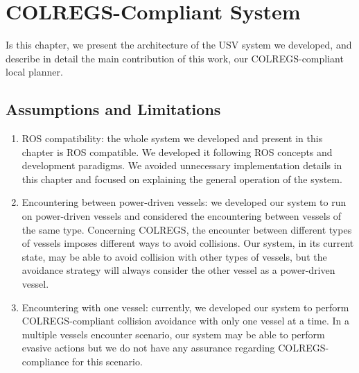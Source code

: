 \chapter{COLREGS-Compliant System}
\label{chap:4_COLREGS_Compliant_Guidance_System}

    Is this chapter, we present the architecture of the \ac{USV} system we developed, and describe in detail the main contribution of this work, our COLREGS-compliant local planner. 

\section{Assumptions and Limitations}
\label{sec:assum_and_limits}


    \begin{enumerate}
        
        \item \ac{ROS} compatibility: the whole system we developed and present in this chapter is ROS compatible. We developed it following \ac{ROS} concepts and development paradigms. We avoided unnecessary implementation details in this chapter and focused on explaining the general operation of the system. %
        
        \item Encountering between power-driven vessels: we developed our system to run on power-driven vessels and considered the encountering between vessels of the same type. Concerning COLREGS, the encounter between different types of vessels imposes different ways to avoid collisions. Our system, in its current state, may be able to avoid collision with other types of vessels, but the avoidance strategy will always consider the other vessel as a power-driven vessel.

        \item Encountering with one vessel: currently, we developed our system to perform COLREGS-compliant collision avoidance with only one vessel at a time. In a multiple vessels encounter scenario, our system may be able to perform evasive actions but we do not have any assurance regarding COLREGS-compliance for this scenario.

    \end{enumerate}


